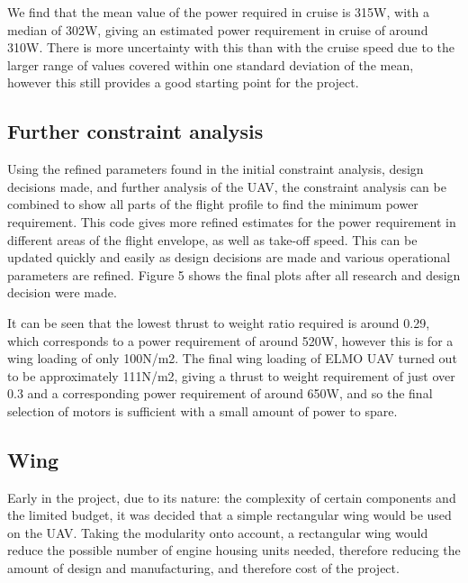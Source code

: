 \documentclass[../../main.tex]{subfiles}
\begin{document}
We find that the mean value of the power required in cruise is 315W, with a median of 302W, giving an estimated power requirement in cruise of around 310W.
There is more uncertainty with this than with the cruise speed due to the larger range of values covered within one standard deviation of the mean, however this still provides a good starting point for the project.

\subsection{Further constraint analysis} \label{sec:design-process:initial-designs:further-constraint-analysis}

Using the refined parameters found in the initial constraint analysis, design decisions made, and further analysis of the UAV, the constraint analysis can be combined to show all parts of the flight profile to find the minimum power requirement.
This code gives more refined estimates for the power requirement in different areas of the flight envelope, as well as take-off speed.
This can be updated quickly and easily as design decisions are made and various operational parameters are refined.
Figure 5 shows the final plots after all research and design decision were made.


It can be seen that the lowest thrust to weight ratio required is around 0.29, which corresponds to a power requirement of around 520W, however this is for a wing loading of only 100N/m2.
The final wing loading of ELMO UAV turned out to be approximately 111N/m2, giving a thrust to weight requirement of just over 0.3 and a corresponding power requirement of around 650W, and so the final selection of motors is sufficient with a small amount of power to spare. 

\subsection{Wing} \label{sec:design-process:initial-designs:wing}

Early in the project, due to its nature: the complexity of certain components and the limited budget, it was decided that a simple rectangular wing would be used on the UAV.
Taking the modularity onto account, a rectangular wing would reduce the possible number of engine housing units needed, therefore reducing the amount of design and manufacturing, and therefore cost of the project. 
\end{document}
